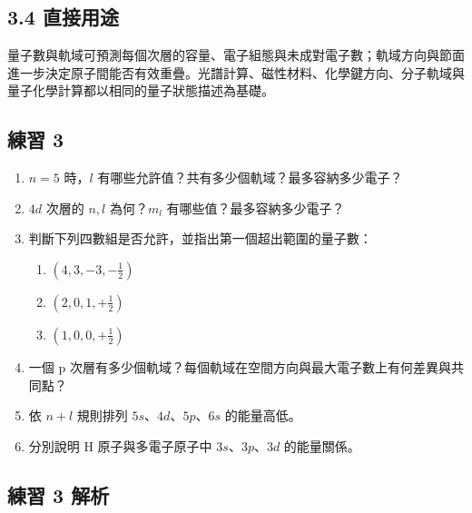 \documentclass[11pt,a4paper]{article}
\providecommand{\tightlist}{%
  \setlength{\itemsep}{0pt}\setlength{\parskip}{0pt}}
\begin{document}
\subsection{3.4 直接用途}\label{ux76f4ux63a5ux7528ux9014}

量子數與軌域可預測每個次層的容量、電子組態與未成對電子數；軌域方向與節面進一步決定原子間能否有效重疊。光譜計算、磁性材料、化學鍵方向、分子軌域與量子化學計算都以相同的量子狀態描述為基礎。

\subsection{練習 3}\label{ux7df4ux7fd2-3}

\begin{enumerate}
\def\labelenumi{\arabic{enumi}.}
\tightlist
\item
  \(n=5\) 時，\(l\) 有哪些允許值？共有多少個軌域？最多容納多少電子？
\item
  \(4d\) 次層的 \(n,l\) 為何？\(m_l\) 有哪些值？最多容納多少電子？
\item
  判斷下列四數組是否允許，並指出第一個超出範圍的量子數：

  \begin{enumerate}
  \def\labelenumii{\arabic{enumii}.}
  \tightlist
  \item
    \((4,3,-3,-\frac12)\)
  \item
    \((2,0,1,+\frac12)\)
  \item
    \((1,0,0,+\frac12)\)
  \end{enumerate}
\item
  一個 p 次層有多少個軌域？每個軌域在空間方向與最大電子數上有何差異與共同點？
\item
  依 \(n+l\) 規則排列 \(5s\)、\(4d\)、\(5p\)、\(6s\) 的能量高低。
\item
  分別說明 H 原子與多電子原子中 \(3s\)、\(3p\)、\(3d\) 的能量關係。
\end{enumerate}

\subsection{練習 3 解析}\label{ux7df4ux7fd2-3-ux89e3ux6790}
\end{document}
